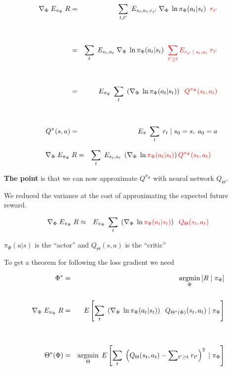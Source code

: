 {

{\huge
\begin{eqnarray*}
    \nabla_\Phi \; E_{\pi_\Phi}\; R  & = & \sum_{t,t'}\;E_{s_t,a_t,r_{t'}}\;\nabla_\Phi\; \ln \pi_\Phi(a_{t}|s_{t})\;\;{\color{red} r_{t'}} \\
    \\
    \\
    & = & \sum_{t}\;E_{s_t,a_t}\;\nabla_\Phi\; \ln \pi_\Phi(a_{t}|s_{t})\;\;{\color{red} \sum_{t' \geq t} E_{r_{t'}\;|\;s_t,a_t}\;r_{t'}} \\
  \\
  \\
  & = & E_{\pi_\Phi} \; \sum_t\; \left(\nabla_\Phi \;\ln \pi_\Phi(a_t|s_t)\right) \;\;{\color{red} Q^{\pi_\Phi}(s_t,a_t)} \\
  \\
  \\
 Q^\pi(s,a) & = & E_{\pi}\;\sum_t\; r_t\;|\;s_0=s,\;a_0=a
 \end{eqnarray*}
}


\begin{eqnarray*}
  \nabla_\Phi \;E_{\pi_\Phi}\;R   & = & \sum_t\;E_{s_t,a_t}\; \left(\nabla_\Phi \;\ln {\color{red} \pi_\Phi(a_t|s_t)}\right) {\color{red} Q^{\pi_\Phi}(s_t,a_t)}
\end{eqnarray*}

\vfill
{\bf The point} is that we can now approximate $Q^{\pi_\Phi}$ with neural network $Q_\Theta$.

\vfill
We reduced the variance at the cost of approximating the expected future reward.


\begin{eqnarray*}
   \nabla_\Phi \;E_{\pi_\Phi}\;R   & \approx & E_{\pi_\Phi} \; \sum_t\; \left(\nabla_\Phi \;\ln {\color{red} \pi_\Phi(a_t|s_t)}\right) \;\;{\color{red} Q_\Theta(s_t,a_t)}
\end{eqnarray*}

\vfill
\centerline{{\color{red} $\pi_\Phi(a|s)$} is the ``actor'' and {\color{red} $Q_\Theta(s,a)$} is the ``critic''}


To get a theorem for following the loss gradient we need

{\huge
\begin{eqnarray}
  \Phi^* & = & \operatorname*{argmin}_\Phi\left[R\;|\;\pi_\Phi\right] \label{AC1} \nonumber \\
  \nonumber \\
  \nabla_\Phi \;E_{\pi_\Phi}\;R   & = & E\left[ \sum_t\; \left(\nabla_\Phi \;\ln \pi_\Phi(a_t|s_t)\right) \;\;Q_{\Theta^*(\Phi)}(s_t,a_t)\;|\; \pi_\Phi\right] \\
  \nonumber \\
  \nonumber \\
  \Theta^*(\Phi) & = & \operatorname*{argmin}_\Theta\; E\left[\sum_t\;\left(Q_\Theta(s_t,a_t) - \sum \!_{t' \geq t}\; r_{t'}\right)^2 \;|\;\pi_\Phi\right] \label{AC2}
\end{eqnarray}
}

}

